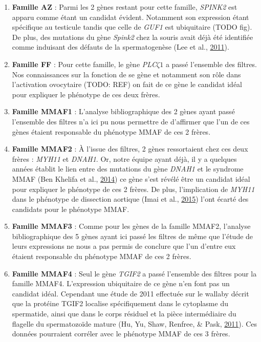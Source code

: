 \documentclass[12pt,twoside]{reedthesis}
\theoremstyle{definition}
\theoremstyle{definition}
\theoremstyle{remark}
\begin{document}
  \begin{enumerate}
  \def\labelenumi{\arabic{enumi}.}
  \item
    \textbf{Famille AZ} : Parmi les 2 gènes restant pour cette famille,
    \emph{SPINK2} est apparu comme étant un candidat évident. Notamment
    son expression étant spécifique au testicule tandis que celle de
    \emph{GUF1} est ubiquitaire (TODO fig). De plus, des mutations du gène
    \emph{Spink2} chez la souris avait déjà été identifiée comme induisant
    des défauts de la spermatogenèse (Lee et al.,
    \protect\hyperlink{ref-Lee2011}{2011}).
  \item
    \textbf{Famille FF} : Pour cette famille, le gène
    \emph{PLC}\(\zeta 1\) a passé l'ensemble des filtres. Nos
    connaissances sur la fonction de se gène et notamment son rôle dans
    l'activation ovocytaire (TODO: REF) on fait de ce gène le candidat
    idéal pour expliquer le phénotype de ces deux frères.\\
  \item
    \textbf{Famille MMAF1} : L'analyse bibliographique des 2 gènes ayant
    passé l'ensemble des filtres n'a ici pu nous permettre de d'affirmer
    que l'un de ces gènes étaient responsable du phénotype MMAF de ces 2
    frères.\\
  \item
    \textbf{Famille MMAF2} : À l'issue des filtres, 2 gènes ressortaient
    chez ces deux frères : \emph{MYH11} et \emph{DNAH1}. Or, notre équipe
    ayant déjà, il y a quelques années établit le lien entre des mutations
    du gène \emph{DNAH1} et le syndrome MMAF (Ben Khelifa et al.,
    \protect\hyperlink{ref-BenKhelifa2014}{2014}) ce gène s'est révélé
    être un candidat idéal pour expliquer le phénotype de ces 2 frères. De
    plus, l'implication de \emph{MYH11} dans le phénotype de dissection
    aortique (Imai et al., \protect\hyperlink{ref-Imai2015}{2015}) l'ont
    écarté des candidats pour le phénotype MMAF.\\
  \item
    \textbf{Famille MMAF3} : Comme pour les gènes de la famille MMAF2,
    l'analyse bibliographique des 5 gènes ayant ici passé les filtres de
    même que l'étude de leurs expressions ne nous a pas permis de conclure
    que l'un d'entre eux étaient responsable du phénotype MMAF de ces 2
    frères.\\
  \item
    \textbf{Famille MMAF4} : Seul le gène \emph{TGIF2} a passé l'ensemble
    des filtres pour la famille MMAF4. L'expression ubiquitaire de ce gène
    n'en font pas un candidat idéal. Cependant une étude de 2011 effectuée
    sur le wallaby décrit que la protéine TGIF2 localise spécifiquement
    dans le cytoplasme du spermatide, ainsi que dans le corps résiduel et
    la pièce intermédiaire du flagelle du spermatozoïde mature (Hu, Yu,
    Shaw, Renfree, \& Pask, \protect\hyperlink{ref-Hu2011}{2011}). Ces
    données pourraient corréler avec le phénotype MMAF de ces 3 frères.
  \end{enumerate}
  
\end{document}
